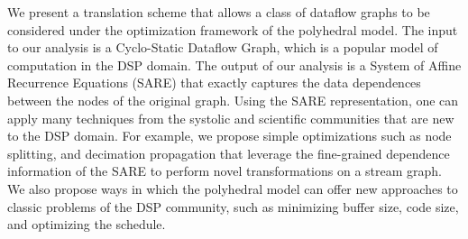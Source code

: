We present a translation scheme that allows a class of dataflow graphs
to be considered under the optimization framework of the polyhedral
model.  The input to our analysis is a Cyclo-Static Dataflow Graph,
which is a popular model of computation in the DSP domain.  The output
of our analysis is a System of Affine Recurrence Equations (SARE) that
exactly captures the data dependences between the nodes of the
original graph.  Using the SARE representation, one can apply many
techniques from the systolic and scientific communities that are new
to the DSP domain.  For example, we propose simple optimizations such
as node splitting, and decimation propagation that leverage the
fine-grained dependence information of the SARE to perform novel
transformations on a stream graph.  We also propose ways in which the
polyhedral model can offer new approaches to classic problems of the
DSP community, such as minimizing buffer size, code size, and
optimizing the schedule.
